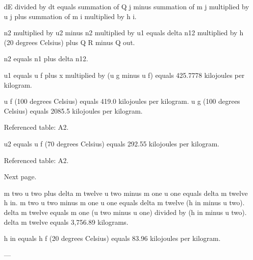 dE divided by dt equals summation of Q j minus summation of m j multiplied by u j plus summation of m i multiplied by h i.  

n2 multiplied by u2 minus n2 multiplied by u1 equals delta n12 multiplied by h (20 degrees Celsius) plus Q R minus Q out.  

n2 equals n1 plus delta n12.  

u1 equals u f plus x multiplied by (u g minus u f) equals 425.7778 kilojoules per kilogram.  

u f (100 degrees Celsius) equals 419.0 kilojoules per kilogram.  
u g (100 degrees Celsius) equals 2085.5 kilojoules per kilogram.  

Referenced table: A2.  

u2 equals u f (70 degrees Celsius) equals 292.55 kilojoules per kilogram.  

Referenced table: A2.  

Next page.

m two u two plus delta m twelve u two minus m one u one equals delta m twelve h in.  
m two u two minus m one u one equals delta m twelve (h in minus u two).  
delta m twelve equals m one (u two minus u one) divided by (h in minus u two).  
delta m twelve equals 3,756.89 kilograms.  

h in equals h f (20 degrees Celsius) equals 83.96 kilojoules per kilogram.  

---